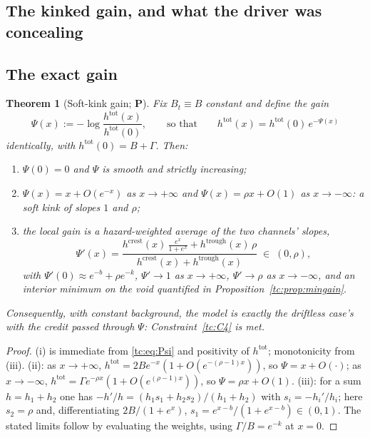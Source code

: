 \documentclass[11pt]{article}
\numberwithin{equation}{section}
\theoremstyle{plain}
\newtheorem{theorem}{Theorem}[section]
\theoremstyle{definition}
\theoremstyle{remark}
\begin{document}
\subsection{The kinked gain, and what the driver was concealing}
\label{tc:sub:gain}

\subsection{The exact gain}\label{tc:subsub:gain}

\begin{theorem}[Soft-kink gain; \textbf{P}]\label{tc:thm:gain}
Fix $B_t\equiv B$ constant and define the \emph{gain}
\begin{equation}\label{tc:eq:Psi}
\Psi(x):=-\log\frac{h^{\mathrm{tot}}(x)}{h^{\mathrm{tot}}(0)},
\qquad\text{so that}\qquad
h^{\mathrm{tot}}(x)=h^{\mathrm{tot}}(0)\,e^{-\Psi(x)}
\end{equation}
identically, with $h^{\mathrm{tot}}(0)=B+\Gamma$. Then:
\begin{enumerate}[label=\emph{(\roman*)},itemsep=1pt]
\item $\Psi(0)=0$ and $\Psi$ is smooth and strictly increasing;
\item $\Psi(x)=x+O(e^{-x})$ as $x\to+\infty$ and
$\Psi(x)=\rho x+O(1)$ as $x\to-\infty$: a \emph{soft kink} of slopes
$1$ and $\rho$;
\item the local gain is a hazard-weighted average of the two channels'
slopes,
\begin{equation}\label{tc:eq:Psiprime}
\Psi'(x)=\frac{h^{\mathrm{crest}}(x)\,\frac{e^{x}}{1+e^{x}}
+h^{\mathrm{trough}}(x)\,\rho}
{h^{\mathrm{crest}}(x)+h^{\mathrm{trough}}(x)}\;\in\;(0,\rho),
\end{equation}
with $\Psi'(0)\approx e^{-b}+\rho e^{-k}$, $\Psi'\to1$ as
$x\to+\infty$, $\Psi'\to\rho$ as $x\to-\infty$, and an interior minimum
on the void quantified in Proposition~\ref{tc:prop:mingain}.
\end{enumerate}
Consequently, with constant background, the model is exactly the driftless case's with the credit passed through $\Psi$: Constraint~\ref{tc:C4} is
met.
\end{theorem}

\begin{proof}
(i) is immediate from \eqref{tc:eq:Psi} and positivity of
$h^{\mathrm{tot}}$; monotonicity from (iii). (ii): as $x\to+\infty$,
$h^{\mathrm{tot}}=2Be^{-x}(1+O(e^{-(\rho-1)x}))$, so $\Psi=x+O(\cdot)$;
as $x\to-\infty$, $h^{\mathrm{tot}}=\Gamma e^{-\rho x}(1+O(e^{(\rho-1)
x}))$, so $\Psi=\rho x+O(1)$. (iii): for a sum $h=h_1+h_2$ one has
$-h'/h=(h_1s_1+h_2s_2)/(h_1+h_2)$ with $s_i=-h_i'/h_i$; here
$s_2=\rho$ and, differentiating $2B/(1+e^{x})$,
$s_1=e^{x-b}/(1+e^{x-b})\in(0,1)$. The stated limits follow by
evaluating the weights, using $\Gamma/B=e^{-k}$ at $x=0$.
\end{proof}
\end{document}
